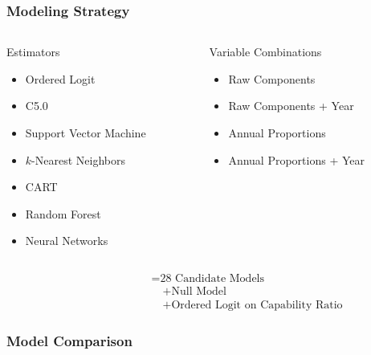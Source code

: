 \documentclass{beamer}
\begin{document}
\begin{frame}
  \frametitle{Modeling Strategy}

  \begin{columns}[t]
    \begin{column}{0.45\textwidth}
      \begin{block}{Estimators}
        \begin{itemize}
          \item Ordered Logit
          \item C5.0
          \item Support Vector Machine
          \item $k$-Nearest Neighbors
          \item CART
          \item Random Forest
          \item Neural Networks
        \end{itemize}
      \end{block}
    \end{column}

    \begin{column}{0.45\textwidth}
      \begin{block}{Variable Combinations}
        \begin{itemize}
          \item Raw Components
          \item Raw Components + Year
          \item Annual Proportions
          \item Annual Proportions + Year
        \end{itemize}
      \end{block}
    \end{column}
  \end{columns}

  \vspace{-2em}
  \begin{align*}
    \qquad\qquad\qquad
    &= \text{28 Candidate Models} \\
    &\quad + \text{Null Model} \\
    &\quad + \text{Ordered Logit on Capability Ratio}
  \end{align*}
\end{frame}

\begin{frame}
  \frametitle{Model Comparison}

  
\end{frame}
\end{document}
